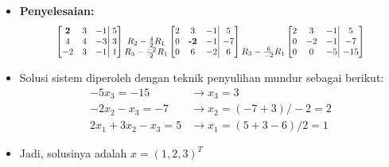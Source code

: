 \documentclass[pdflatex,compress,mathserif]{beamer}
\newcommand*{\Scale}[2][4]{\scalebox{#1}{$#2$}}%
\begin{document}
\begin{frame}
	\begin{itemize}
		\item \textbf{Penyelesaian:}
		\[
			\Scale[0.8]{
			\left[
				\begin{matrix}
				\textbf{2} & 3 & -1 \\
				4 & 4 & -3 \\
				-2 & 3 & -1
				\end{matrix}
			\right|
			\left.
				\begin{matrix}
				5 \\
				3 \\
				1
				\end{matrix}
			\right]
				\begin{matrix}
				\\
				R_2 - \frac{4}{2}R_1 \\
				R_3 - \frac{-2}{2}R_1
				\end{matrix}
			\left[
				\begin{matrix}
				2 & 3 & -1 \\
				0 & \textbf{-2} & -1 \\
				0 & 6 & -2
				\end{matrix}
			\right|
			\left.
				\begin{matrix}
				5 \\
				-7 \\
				6
				\end{matrix}
			\right]
				\begin{matrix}
				\\
				\\
				R_3 - \frac{6}{-2}R_1
				\end{matrix}
			\left[
				\begin{matrix}
				2 & 3 & -1 \\
				0 & -2 & -1 \\
				0 & 0 & -5
				\end{matrix}
			\right|
			\left.
				\begin{matrix}
				5 \\
				-7 \\
				-15
				\end{matrix}
			\right]}
		\]
		\item Solusi sistem diperoleh dengan teknik penyulihan mundur sebagai berikut:
		\begin{align*}
		-5x_3 = -15 &\rightarrow x_3 = 3 \\
		-2x_2 - x_3 = -7 &\rightarrow x_2 = (-7 + 3)/-2 = 2 \\
		2x_1 + 3x_2 - x_3 = 5 &\rightarrow x_1 = (5 + 3 - 6)/2 = 1
		\end{align*}
		\item Jadi, solusinya adalah $ x = (1,2,3)^T $
	\end{itemize}
\end{frame}
\end{document}
